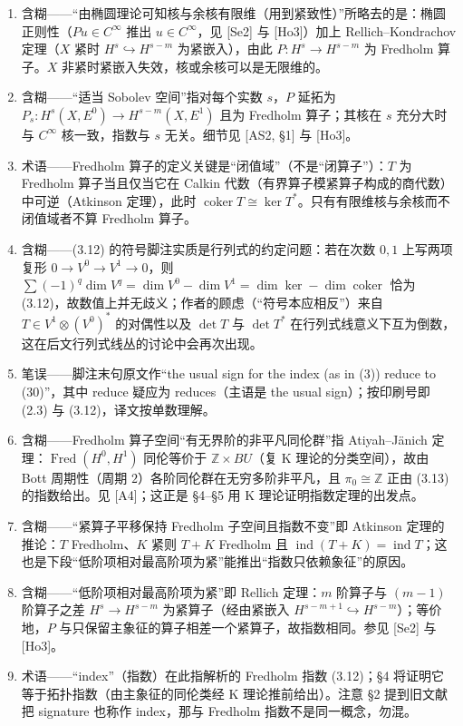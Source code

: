 \documentclass[11pt]{amsart}
\theoremstyle{definition}
\theoremstyle{remark}
\theoremstyle{plain}
\numberwithin{equation}{section}
\renewcommand{\:}{\colon}
\newcommand{\ZZ}{{\mathbb Z}}
\DeclareMathOperator{\coker}{coker}
\DeclareMathOperator{\ind}{ind}
\DeclareMathOperator{\Fred}{Fred}
\begin{document}
\begin{enumerate}[leftmargin=2.2em,itemsep=2pt,topsep=2pt]
  \item 含糊——“由椭圆理论可知核与余核有限维（用到紧致性）”所略去的是：椭圆正则性（$Pu\in C^\infty$ 推出 $u\in C^\infty$，见 [Se2] 与 [Ho3]）加上 Rellich–Kondrachov 定理（$X$ 紧时 $H^s\hookrightarrow H^{s-m}$ 为紧嵌入），由此 $P:H^s\to H^{s-m}$ 为 Fredholm 算子。$X$ 非紧时紧嵌入失效，核或余核可以是无限维的。
  \item 含糊——“适当 Sobolev 空间”指对每个实数 $s$，$P$ 延拓为 $P_s:H^s(X,E^0)\to H^{s-m}(X,E^1)$ 且为 Fredholm 算子；其核在 $s$ 充分大时与 $C^\infty$ 核一致，指数与 $s$ 无关。细节见 [AS2, §1] 与 [Ho3]。
  \item 术语——Fredholm 算子的定义关键是“闭值域”（不是“闭算子”）：$T$ 为 Fredholm 算子当且仅当它在 Calkin 代数（有界算子模紧算子构成的商代数）中可逆（Atkinson 定理），此时 $\coker T\cong\ker T^*$。只有有限维核与余核而不闭值域者不算 Fredholm 算子。
  \item 含糊——(3.12) 的符号脚注实质是行列式的约定问题：若在次数 $0,1$ 上写两项复形 $0\to V^0\to V^1\to0$，则 $\sum(-1)^q\dim V^q=\dim V^0-\dim V^1=\dim\ker-\dim\coker$ 恰为 (3.12)，故数值上并无歧义；作者的顾虑（“符号本应相反”）来自 $T\in V^1\otimes(V^0)^*$ 的对偶性以及 $\det T$ 与 $\det T^*$ 在行列式线意义下互为倒数，这在后文行列式线丛的讨论中会再次出现。
  \item 笔误——脚注末句原文作“the usual sign for the index (as in (3)) reduce to (30)”，其中 reduce 疑应为 reduces（主语是 the usual sign）；按印刷号即 (2.3) 与 (3.12)，译文按单数理解。
  \item 含糊——Fredholm 算子空间“有无界阶的非平凡同伦群”指 Atiyah–Jänich 定理：$\Fred(H^0,H^1)$ 同伦等价于 $\ZZ\times BU$（复 K 理论的分类空间），故由 Bott 周期性（周期 $2$）各阶同伦群在无穷多阶非平凡，且 $\pi_0\cong\ZZ$ 正由 (3.13) 的指数给出。见 [A4]；这正是 §4–§5 用 K 理论证明指数定理的出发点。
  \item 含糊——“紧算子平移保持 Fredholm 子空间且指数不变”即 Atkinson 定理的推论：$T$ Fredholm、$K$ 紧则 $T+K$ Fredholm 且 $\ind(T+K)=\ind T$；这也是下段“低阶项相对最高阶项为紧”能推出“指数只依赖象征”的原因。
  \item 含糊——“低阶项相对最高阶项为紧”即 Rellich 定理：$m$ 阶算子与 $(m-1)$ 阶算子之差 $H^s\to H^{s-m}$ 为紧算子（经由紧嵌入 $H^{s-m+1}\hookrightarrow H^{s-m}$）；等价地，$P$ 与只保留主象征的算子相差一个紧算子，故指数相同。参见 [Se2] 与 [Ho3]。
  \item 术语——“index”（指数）在此指解析的 Fredholm 指数 (3.12)；§4 将证明它等于拓扑指数（由主象征的同伦类经 K 理论推前给出）。注意 §2 提到旧文献把 signature 也称作 index，那与 Fredholm 指数不是同一概念，勿混。

\end{enumerate}
\end{document}
